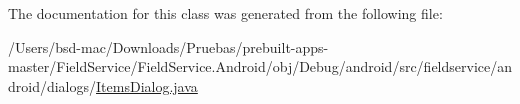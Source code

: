 The documentation for this class was generated from the following file\+:\begin{DoxyCompactItemize}
\item 
/\+Users/bsd-\/mac/\+Downloads/\+Pruebas/prebuilt-\/apps-\/master/\+Field\+Service/\+Field\+Service.\+Android/obj/\+Debug/android/src/fieldservice/android/dialogs/\hyperlink{_items_dialog_8java}{Items\+Dialog.\+java}\end{DoxyCompactItemize}
